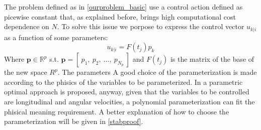 The problem defined as in \ref{ourproblem_basic} use a control action defined as picewise constant that, as explained before, brings high computational cost dependence on $N$. To solve this issue we porpose to express the control vector ${u}_{k|i}$ as a function of some parameters:
\begin{equation}\label{param_eq}
{u}_{k|i}=F(t_j){p}_k
\end{equation}
Where $\textbf{p} \in \mathbb{R}^p$ s.t. $\textbf{p}=[\ p_1,\ p_2,\ \dots,\ p_{N_p}\ ]$ and $F(t_j)$ is the matrix of the base of the new space $R^p$. The parameters  A good choice of the parameterization is made according to the phisics of the variables to be parameterized. In \cite{kelly2013mobile} a parametric optimal approach is proposed, anyway, given that the variables to be controlled are longitudinal and angular velocities, a polynomial parameterization can fit the phisical meaning requirement. A better explanation of how to choose the parameterization will be given in \ref{stabproof}.

